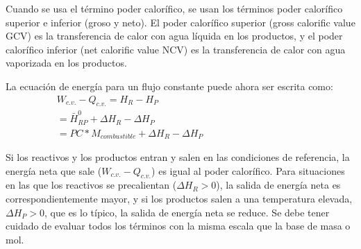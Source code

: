 \par Cuando se usa el término poder calorífico, se usan los términos poder calorífico superior e inferior (groso y neto). El poder calorífico superior (gross calorific value GCV) es la transferencia de calor con agua líquida en los productos, y el poder calorífico inferior (net calorific value NCV) es la transferencia de calor con agua vaporizada en los productos.
\par La ecuación de energía para un flujo constante puede ahora ser escrita como:
\begin{equation}
\label{eq:pc}
\begin{gathered}
    W_{c.v.} - Q_{c.v.} = H_R - H_P \quad\quad\quad\quad\quad\quad\quad
    \quad\quad\quad\quad\quad\quad\quad\quad\\
     = \bar H^0_{RP} + \Delta H_R - \Delta H_P \quad\quad\quad\quad\quad\\
     = PC * M_{combustible} + \Delta H_R - \Delta H_P
\end{gathered}
\end{equation}
\par Si los reactivos y los productos entran y salen en las condiciones de referencia, la energía neta que sale ($W_{c.v.} - Q_{c.v.}$) es igual al poder calorífico. Para situaciones en las que los reactivos se precalientan ($\Delta H_R > 0$), la salida de energía neta es correspondientemente mayor, y si los productos salen a una temperatura elevada, $\Delta H_P > 0$, que es lo típico, la salida de energía neta se reduce. Se debe tener cuidado de evaluar todos los términos con la misma escala que la base de masa o mol.

